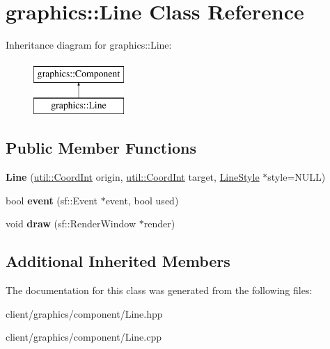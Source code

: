 \hypertarget{classgraphics_1_1_line}{\section{graphics\-:\-:Line Class Reference}
\label{classgraphics_1_1_line}
}
Inheritance diagram for graphics\-:\-:Line\-:\begin{figure}[H]
\begin{center}
\leavevmode
\includegraphics[height=2.000000cm]{classgraphics_1_1_line}
\end{center}
\end{figure}
\subsection*{Public Member Functions}
\begin{DoxyCompactItemize}
\item 
\hypertarget{classgraphics_1_1_line_a6f862271d75f1c8d4d1bdf519c47bdec}{{\bfseries Line} (\hyperlink{classutil_1_1_coordinates}{util\-::\-Coord\-Int} origin, \hyperlink{classutil_1_1_coordinates}{util\-::\-Coord\-Int} target, \hyperlink{classgraphics_1_1_line_style}{Line\-Style} $\ast$style=N\-U\-L\-L)}\label{classgraphics_1_1_line_a6f862271d75f1c8d4d1bdf519c47bdec}

\item 
\hypertarget{classgraphics_1_1_line_afad96295dcf46d42240a6ccca887bd82}{bool {\bfseries event} (sf\-::\-Event $\ast$event, bool used)}\label{classgraphics_1_1_line_afad96295dcf46d42240a6ccca887bd82}

\item 
\hypertarget{classgraphics_1_1_line_a3072928962eee7f6d1ff8cdb8cc695cc}{void {\bfseries draw} (sf\-::\-Render\-Window $\ast$render)}\label{classgraphics_1_1_line_a3072928962eee7f6d1ff8cdb8cc695cc}

\end{DoxyCompactItemize}
\subsection*{Additional Inherited Members}


The documentation for this class was generated from the following files\-:\begin{DoxyCompactItemize}
\item 
client/graphics/component/Line.\-hpp\item 
client/graphics/component/Line.\-cpp\end{DoxyCompactItemize}
